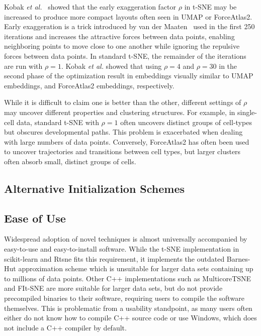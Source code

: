 \documentclass[twocolumn]{bmcart}
\begin{document}
Kobak \textit{et al.}~\cite{todo} showed that the early exaggeration factor $\rho$ in t-SNE may be increased to produce more compact layouts often seen in UMAP or ForceAtlas2. Early exaggeration is a trick introduced by van der Maaten~\cite{maaten2008visualizing} used in the first 250 iterations and increases the attractive forces between data points, enabling neighboring points to move close to one another while ignoring the repulsive forces between data points. In standard t-SNE, the remainder of the iterations are run with $\rho=1$. Kobak \textit{et al.} showed that using $\rho=4$ and $\rho=30$ in the second phase of the optimization result in embeddings visually similar to UMAP embeddings, and ForceAtlas2 embeddings, respectively.

While it is difficult to claim one is better than the other, different settings of $\rho$ may uncover different properties and clustering structures. For example, in single-cell data, standard t-SNE with $\rho=1$ often uncovers distinct groups of cell-types but obscures developmental paths. This problem is exacerbated when dealing with large numbers of data points. Conversely, ForceAtlas2 has often been used to uncover trajectories and transitions between cell types, but larger clusters often absorb small, distinct groups of cells.

\subsection*{Alternative Initialization Schemes}

\subsection*{Ease of Use}

Widespread adoption of novel techniques is almost universally accompanied by easy-to-use and easy-to-install software. While the t-SNE implementation in scikit-learn and Rtsne fits this requirement, it implements the outdated Barnes-Hut approximation scheme which is unsuitable for larger data sets containing up to millions of data points. Other C++ implementations such as MulticoreTSNE and FIt-SNE are more suitable for larger data sets, but do not provide precompiled binaries to their software, requiring users to compile the software themselves. This is problematic from a usability standpoint, as many users often either do not know how to compile C++ source code or use Windows, which does not include a C++ compiler by default.
\end{document}
